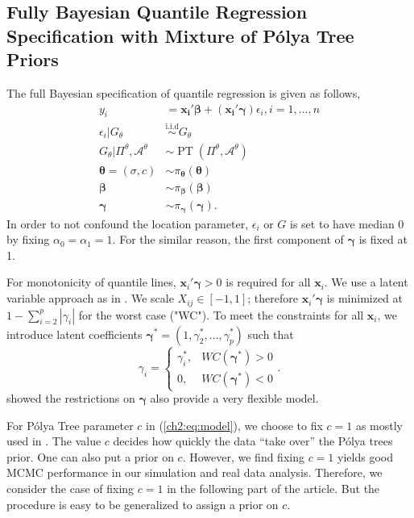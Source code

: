 \documentclass[12pt]{article}
\newcommand{\polya}{P\'{o}lya}
\newcommand{\iid}{\stackrel{\mbox{i.i.d}}{\sim}}
\DeclareMathOperator{\pt}{PT}
\begin{document}
\subsection{Fully Bayesian Quantile Regression Specification with
  Mixture of \polya{} Tree Priors}\label{ch2:sec:bayesmodel}
The full Bayesian specification of quantile regression is given as
follows,
\begin{equation}\label{ch2:eq:model}
\begin{aligned}
  y_i& = \bm{x_i'\beta} + (\bm{x_i'\gamma}) \epsilon_{i}, i = 1,
  \ldots,
  n \\
  \epsilon_i |G_{\theta} & \iid G_{\theta} \\
  G_{\theta}|\Pi^{\theta}, \mathcal{A}^{\theta} & \sim \pt
  (\Pi^{\theta}, \mathcal{A}^{\theta}) \\
  \bm{\theta} = (\sigma, c) & \sim \pi_{\bm \theta}(\bm \theta) \\
  \bm{\beta} & \sim \pi_{\bm \beta}(\bm \beta)\\
  \bm{\gamma} &\sim \pi_{\bm \gamma}(\bm \gamma).
\end{aligned}
\end{equation}
In order to not confound the location parameter, $\epsilon_i $ or $G$
is set to have median 0 by fixing $\alpha_0=\alpha_1 = 1$. For the
similar reason, the first component of $\bm{\gamma}$ is fixed at 1.

For monotonicity of quantile lines, $\bm x_i\prime \bm \gamma > 0$ is required for all $\bm x_i$.
We use a latent variable approach as in \citet{reich2011}.
We scale $X_{ij} \in [-1, 1]$; therefore $\bm x_i\prime \bm \gamma$ is minimized at $1 - \sum_{i = 2}^{p} |\gamma_i|$ for the worst case ("WC").
To meet the constraints for all $\bm x_i$, we introduce latent coefficients $\bm \gamma^{*} = (1, \gamma_2^{*}, \ldots, \gamma_p^{*})$ such that
\begin{displaymath}
\gamma_i =
\begin{cases}
\gamma_i^{*}, & WC(\bm \gamma^{*}) > 0 \\
0,            & WC(\bm \gamma^{*} ) < 0
\end{cases}.
\end{displaymath}
\citet{reich2013} showed the restrictions on $\bm \gamma$ also provide a very flexible model.

For \polya{} Tree parameter $c$ in (\ref{ch2:eq:model}), we choose to fix $c = 1$ as mostly used in \citet{hanson2006}.
The value $c$ decides how quickly the data ``take over'' the \polya{} trees prior.
One can also put a prior on $c$.
However, we find fixing $c = 1$ yields good MCMC performance in our simulation and real data analysis.
Therefore, we consider the case of fixing $c = 1$ in the following part of the article.
But the procedure is easy to be generalized to assign a prior on $c$.
\end{document}

